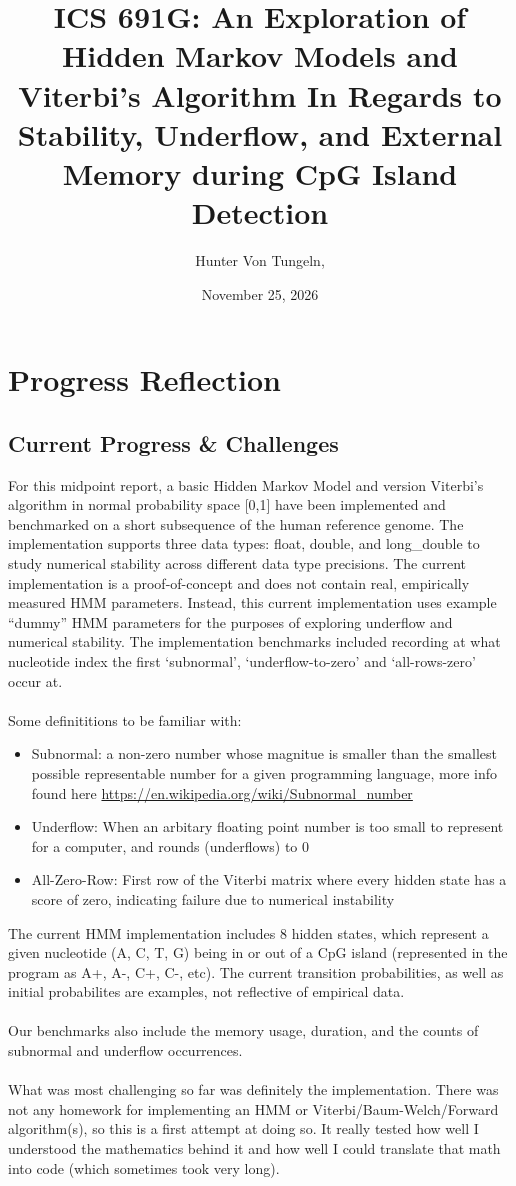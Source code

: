 \documentclass{article}
\title{ICS 691G: An Exploration of Hidden Markov Models and Viterbi's Algorithm In Regards to Stability, Underflow, and External Memory during CpG Island Detection}
\author{Hunter Von Tungeln,}
\date{November 25, 2026}
\begin{document}
\maketitle
\section{Progress Reflection}
\subsection{Current Progress \& Challenges}
For this midpoint report, a basic Hidden Markov Model and version Viterbi's algorithm in normal probability space [0,1] have been implemented and benchmarked on a short subsequence of the human reference genome. The implementation supports three data types: float, double, and long\_double to study numerical stability across different data type precisions. The current implementation is a proof-of-concept and does not contain real, empirically measured HMM parameters. Instead, this current implementation uses example ``dummy'' HMM parameters for the purposes of exploring underflow and numerical stability. The implementation benchmarks included recording at what nucleotide index the first `subnormal', `underflow-to-zero' and `all-rows-zero' occur at. \\\\
Some definititions to be familiar with: 
\begin{itemize}
  \item Subnormal: a non-zero number whose magnitue is smaller than the smallest possible representable number for a given programming language, more info found here \href{https://en.wikipedia.org/wiki/Subnormal\_number}{https://en.wikipedia.org/wiki/Subnormal\_number}
  \item Underflow: When an arbitary floating point number is too small to represent for a computer, and rounds (underflows) to 0
  \item All-Zero-Row: First row of the Viterbi matrix where every hidden state has a score of zero, indicating failure due to numerical instability
\end{itemize}
The current HMM implementation includes 8 hidden states, which represent a given nucleotide (A, C, T, G) being in or out of a CpG island (represented in the program as A+, A-, C+, C-, etc). The current transition probabilities, as well as initial probabilites are examples, not reflective of empirical data. \\\\
Our benchmarks also include the memory usage, duration, and the counts of subnormal and underflow occurrences. \\\\
What was most challenging so far was definitely the implementation. There was not any homework for implementing an HMM or Viterbi/Baum-Welch/Forward algorithm(s), so this is a first attempt at doing so. It really tested how well I understood the mathematics behind it and how well I could translate that math into code (which sometimes took very long). 
\end{document}
